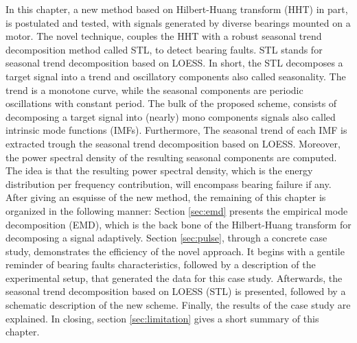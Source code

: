 \documentclass[../Main/thesis.tex]{subfiles}
\begin{document}
\justify
In this chapter, a new method based on Hilbert-Huang transform (HHT) in part, is postulated and tested, with signals generated by diverse bearings mounted on a motor. The novel technique, couples the HHT with a robust seasonal trend decomposition method called STL, to detect bearing faults. STL stands for seasonal trend decomposition based on LOESS. In short, the STL decomposes a target signal into a trend and oscillatory components also called  seasonality. The trend is a monotone curve, while the seasonal components are periodic oscillations with constant period.
\justify
The bulk of the proposed scheme, consists of decomposing a target signal into (nearly) mono components signals also called intrinsic mode functions (IMFs). Furthermore, The seasonal trend of each IMF is extracted trough the seasonal trend decomposition based on LOESS. Moreover, the power spectral density of the resulting seasonal components are computed. The idea is that the resulting power spectral density, which is the energy distribution per frequency contribution, will encompass bearing failure if any.
\justify
After giving an esquisse of the new method, the remaining of this chapter is organized in the following manner:
 Section \ref{sec:emd} presents the empirical mode decomposition (EMD), which is the back bone of the Hilbert-Huang transform for decomposing a signal adaptively. Section \ref{sec:pulse}, through a concrete case study, demonstrates the efficiency of the novel approach. It begins with a gentile reminder of  bearing faults characteristics, followed by a description of the experimental setup, that generated the data for this case study. Afterwards, the seasonal trend decomposition based on LOESS (STL) is presented, followed by a schematic description of the new scheme. Finally, the results of the case study are explained. In closing, section \ref{sec:limitation} gives a short summary of this chapter.
\justify



 
\end{document}
